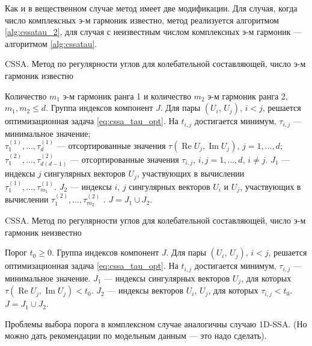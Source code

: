 \documentclass[specialist,
               substylefile = spbu.rtx,
               subf,href,colorlinks=true, 12pt]{disser}
\def\RE{\mathop{\mathrm{Re}}}
\def\IM{\mathop{\mathrm{Im}}}
\begin{document}
Как и в вещественном случае метод имеет две модификации. Для случая, когда число комплексных э-м гармоник известно, метод реализуется алгоритмом \ref{alg:cssatau_2}, для случая с неизвестным числом комплексных э-м гармоник --- алгоритмом \ref{alg:cssatau}. 

\begin{algorithm}[!hhh]
\caption{CSSA. Метод по регулярности углов для колебательной составляющей, число э-м гармоник известно}
\label{alg:cssatau_2}
\begin{algorithmic}[1]
\REQUIRE Количество $m_1$ э-м гармоник ранга 1 и количество $m_2$ э-м гармоник ранга 2,  $m_1, m_2 \leqslant d$.
\ENSURE Группа индексов компонент $J$.
\STATE Для пары $(U_i,\,U_j)$, $i<j$, решается оптимизационная задача \eqref{eq:cssa_tau_opt}.
На $t_{i,j}$ достигается минимум, $\tau_{i,j}$ --- минимальное значение;\\
$\tau_1^{(1)}, \ldots, \tau_d^{(1)}$ --- отсортированные значения $\tau(\RE U_j, \IM U_j)$, $j=1,\ldots, d$;\\
$\tau_1^{(2)}, \ldots, \tau_{d(d-1)}^{(2)}$ --- отсортированные значения $\tau_{i,j}$, $i,j=1,\ldots, d$, $i \not = j$.  
\STATE  $J_1$ --- индексы $j$ сингулярных векторов $U_j$, участвующих в вычислении\\ $\tau_1^{(1)}, \ldots, \tau_{m_1}^{(1)}$. 
\STATE  $J_2$ --- индексы $i$, $j$ сингулярных векторов $U_i$ и $U_j$, участвующих в вычислении $\tau_1^{(2)}, \ldots, \tau_{m_2}^{(2)}$ . 
\STATE $J = J_1 \cup J_2$.
\end{algorithmic}
\end{algorithm}

\begin{algorithm}[!hhh]
\caption{CSSA. Метод по регулярности углов для колебательной составляющей, число э-м гармоник неизвестно}
\label{alg:cssatau}
\begin{algorithmic}[1]
\REQUIRE Порог $t_0 \geqslant 0$.
\ENSURE Группа индексов компонент $J$.
\STATE Для пары $(U_i,\,U_j)$, $i<j$, решается оптимизационная задача \eqref{eq:cssa_tau_opt}.
На $t_{i,j}$ достигается минимум, $\tau_{i,j}$ --- минимальное значение. 
\STATE  $J_1$ --- индексы сингулярных векторов $U_j$, для которых $\tau(\RE U_j, \IM U_j) < t_0$.
\STATE  $J_2$ --- индексы векторов  $U_i$, $U_j$, для которых  $\tau_{i,j} < t_0$.
\STATE $J = J_1 \cup J_2$.
\end{algorithmic}
\end{algorithm}

Проблемы выбора порога в комплексном случае аналогичны случаю 1D-SSA.
(Но можно дать рекомендации по модельным данным --- это надо сделать).
\end{document}
